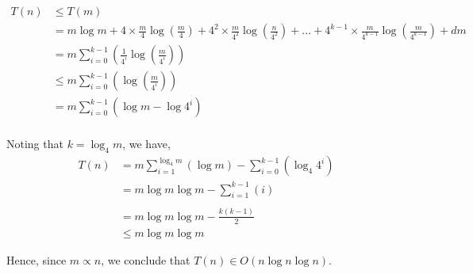 \begin{enumerate}
          \begin{align*}
              T(n) & \le T(m)                                                                                                                                                                                                                    \\
                   & = m \log{m} + 4 \times \frac{m}{4} \log{\left( \frac{m}{4} \right)} + 4^2 \times \frac{m}{4^2} \log{\left( \frac{n}{4^2} \right)} + ... + 4^{k-1} \times \frac{m}{4^{k - 1}} \log{\left( \frac{m}{4^{k - 1}} \right)} + d m \\
                   & = m \sum_{i=0}^{k-1} \left( \frac{1}{4^i} \log{\left(\frac{m}{4^i}\right)} \right)                                                                                                                                          \\
                   & \le m \sum_{i=0}^{k-1} \left( \log{\left(\frac{m}{4^i}\right)} \right)                                                                                                                                                      \\
                   & = m \sum_{i=0}^{k-1} \left( \log{m} - \log{4^i}  \right)                                                                                                                                                                    \\
          \end{align*}

          Noting that $k = \log_4{m}$, we have,
          \begin{align*}
              T(n) & = m \sum_{i=1}^{\log_4{m}} \left( \log{m} \right) - \sum_{i=0}^{k-1}\left(\log_4{4^i}\right) \\
                   & = m \log{m} \log{m} - \sum_{i=1}^{k-1}\left(i\right)                                         \\                                                                                                                             \\
                   & = m \log{m} \log{m} - \frac{k\left(k-1\right)}{2}                                            \\
                   & \le m \log{m} \log{m}
          \end{align*}

          Hence, since $m \propto n$, we conclude that $T\left(n\right) \in O\left(n \log{n} \log{n} \right)$.


\end{enumerate}
